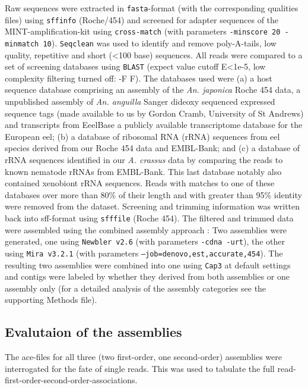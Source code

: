 Raw sequences were extracted in \texttt{fasta}-format (with the
corresponding qualities files) using \texttt{sffinfo} (Roche/454) and
screened for adapter sequences of the MINT-amplification-kit using
\texttt{cross-match} \cite{PHRAP} (with parameters \texttt{-minscore
  20 -minmatch 10}). \texttt{Seqclean} \cite{tgicl_pertea} was used to
identify and remove poly-A-tails, low quality, repetitive and short
(<100 base) sequences. All reads were compared to a set of screening
databases using \texttt{BLAST} (expect value cutoff E<1e-5, low
complexity filtering turned off: -F F). The databases used were (a) a
host sequence database comprising an assembly of the
\textit{An. japonica} Roche 454 data, a unpublished assembly of
\textit{An. anguilla} Sanger dideoxy sequenced expressed sequence tags
(made available to us by Gordon Cramb, University of St Andrews) and
transcripts from EeelBase \cite{pmid21080939} a publicly available
transcriptome database for the European eel; (b) a database of
ribosomal RNA (rRNA) sequences from eel species derived from our Roche
454 data and EMBL-Bank; and (c) a database of rRNA sequences
identified in our \textit{A. crassus} data by comparing the reads to
known nematode rRNAs from EMBL-Bank. This last database notably also
contained xenobiont rRNA sequences. Reads with matches to one of these
databases over more than 80\% of their length and with greater than
95\% identity were removed from the dataset. Screening and trimming
information was written back into sff-format using \texttt{sfffile}
(Roche 454). The filtered and trimmed data were assembled using the
combined assembly approach \cite{pmid20950480}: Two assemblies were
generated, one using \texttt{Newbler v2.6} \cite{pmid16056220} (with
parameters \texttt{-cdna -urt}), the other using \texttt{Mira v3.2.1}
\cite{miraEST} (with parameters
\texttt{--job=denovo,est,accurate,454}). The resulting two assemblies
were combined into one using \texttt{Cap3} \cite{Cap3_Huang} at
default settings and contigs were labeled by whether they derived from
both assemblies or one assembly only (for a detailed analysis of the
assembly categories see the supporting Methods file).

\subsection*{Evalutaion of the assemblies}

The ace-files for all three (two first-order, one second-order)
assemblies were interrogated for the fate of single reads. This was
used to tabulate the full read-first-order-second-order-associations.

